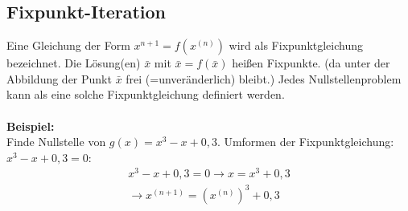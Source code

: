 \documentclass{scrartcl}
\begin{document}
\subsection{Fixpunkt-Iteration}
Eine Gleichung der Form $x^{n+1}=f(x^{(n)})$ wird als Fixpunktgleichung bezeichnet.
Die Lösung(en) $\bar{x}$ mit $\bar{x}=f(\bar{x})$ heißen Fixpunkte. (da unter der Abbildung der Punkt $\bar{x}$ frei (=unveränderlich) bleibt.)
Jedes Nullstellenproblem kann als eine solche Fixpunktgleichung definiert werden.\\
\\
\textbf{Beispiel:}\\
Finde Nullstelle von $g(x)=x^3-x+0,3$.
Umformen der Fixpunktgleichung: $x^3-x+0,3=0$:
\begin{align*}
x^3-x+0,3=0 \rightarrow x=x^3+0,3 \\
\rightarrow x^{(n+1)}=(x^{(n)})^3+0,3
\end{align*}
\end{document}
